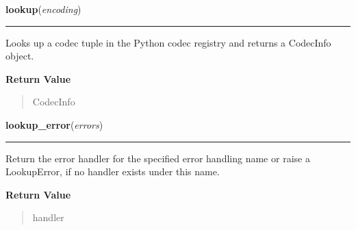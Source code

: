     \label{codecs:lookup}

    \vspace{0.5ex}

\hspace{.8\funcindent}\begin{boxedminipage}{\funcwidth}

    \raggedright \textbf{lookup}(\textit{encoding})

    \vspace{-1.5ex}

    \rule{\textwidth}{0.5\fboxrule}
\setlength{\parskip}{2ex}
    Looks up a codec tuple in the Python codec registry and returns a 
    CodecInfo object.

\setlength{\parskip}{1ex}
      \textbf{Return Value}
    \vspace{-1ex}

      \begin{quote}
      CodecInfo

      \end{quote}

    \end{boxedminipage}

    \label{codecs:lookup_error}

    \vspace{0.5ex}

\hspace{.8\funcindent}\begin{boxedminipage}{\funcwidth}

    \raggedright \textbf{lookup\_error}(\textit{errors})

    \vspace{-1.5ex}

    \rule{\textwidth}{0.5\fboxrule}
\setlength{\parskip}{2ex}
    Return the error handler for the specified error handling name or raise
    a LookupError, if no handler exists under this name.

\setlength{\parskip}{1ex}
      \textbf{Return Value}
    \vspace{-1ex}

      \begin{quote}
      handler

      \end{quote}

    \end{boxedminipage}

    \label{codecs:open}


